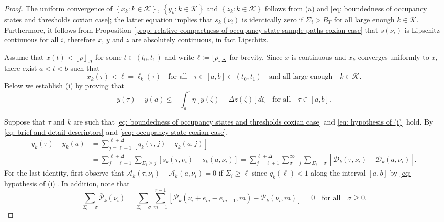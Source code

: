 \documentclass[a4paper, 12pt]{article}
\theoremstyle{definition}
\newcommand{\floor}[1]{\left\lfloor#1\right\rfloor}
\newcommand{\set}[2]{\left\{#1 : #2\right\}}
\newcommand{\defeq}{\vcentcolon=}
\newcommand{\calA}{\mathcal{A}}
\newcommand{\calD}{\mathcal{D}}
\newcommand{\calK}{\mathcal{K}}
\newcommand{\calP}{\mathcal{P}}
\begin{document}
\begin{proof}
The uniform convergence of $\set{x_k}{k \in \calK}$, $\set{y_k}{k \in \calK}$ and $\set{z_k}{k \in \calK}$ follows from (a) and \eqref{eq: boundedness of occupancy states and thresholds coxian case}; the latter equation implies that $s_k(\nu_i)$ is identically zero if $\Sigma_i > B_T$ for all large enough $k \in \calK$. Furthermore, it follows from Proposition \ref{prop: relative compactness of occupancy state sample paths coxian case} that $s(\nu_i)$ is Lipschitz continuous for all $i$, therefore $x$, $y$ and $z$ are absolutely continuous, in fact Lipschitz.

Assume that $x(t) < \floor{\rho}_\Delta$ for some $t \in (t_0, t_1)$ and write $\ell \defeq \floor{\rho}_\Delta$ for brevity. Since $x$ is continuous and $x_k$ converges uniformly to $x$, there exist $a < t < b$ such that
\begin{equation}
	\label{eq: hypothesis of (i)}
	x_k(\tau) < \ell = \ell_k(\tau) \quad \text{for all} \quad \tau \in [a, b] \subset (t_0, t_1) \quad \text{and all large enough} \quad k \in \calK.
\end{equation}
Below we establish (i) by proving that
\begin{equation*}
	y(\tau) - y(a) \leq -\int_a^\tau \eta \left[y(\zeta) - \Delta z(\zeta)\right]d\zeta \quad \text{for all} \quad \tau \in [a, b].
\end{equation*}

Suppose that $\tau$ and $k$ are such that \eqref{eq: boundedness of occupancy states and thresholds coxian case} and \eqref{eq: hypothesis of (i)} hold. By \eqref{eq: brief and detail descriptors} and \eqref{seq: occupancy state coxian case},
\begin{align*}
	y_k(\tau) - y_k(a) &= \sum_{j = \ell + 1}^{\ell + \Delta} \left[q_k(\tau, j) - q_k(a, j)\right] \\
	&= \sum_{j = \ell + 1}^{\ell + \Delta} \sum_{\Sigma_i \geq j} \left[s_k(\tau, \nu_i) - s_k(a, \nu_i)\right] = \sum_{j = \ell + 1}^{\ell + \Delta} \sum_{\sigma = j}^\infty \sum_{\Sigma_i = \sigma} \left[\bar{\calD}_k(\tau, \nu_i) - \bar{\calD}_k(a, \nu_i)\right].
\end{align*}
For the last identity, first observe that $\calA_k(\tau, \nu_i) - \calA_k(a, \nu_i) = 0$ if $\Sigma_i \geq \ell$ since $q_k(\ell) < 1$ along the interval $[a, b]$ by \eqref{eq: hypothesis of (i)}. In addition, note that
\begin{equation*}
	\sum_{\Sigma_i = \sigma} \bar{\calP}_k(\nu_i) = \sum_{\Sigma_i = \sigma} \sum_{m = 1}^{r - 1} \left[\calP_k(\nu_i + e_m - e_{m + 1}, m) - \calP_k(\nu_i, m)\right] = 0 \quad \text{for all} \quad \sigma \geq 0.
\end{equation*}


\end{proof}
\end{document}
